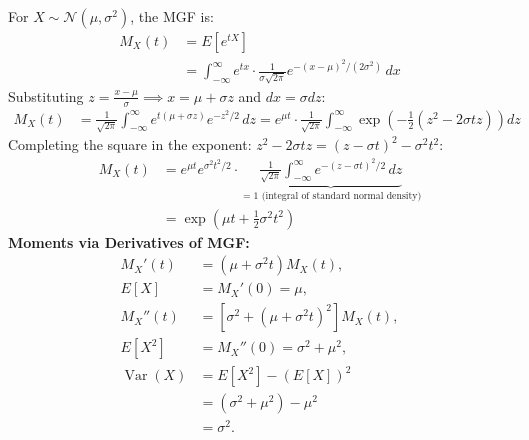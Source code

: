 \documentclass[12pt,a4paper]{article}
\begin{document}
\begin{tcolorbox}[examplebox, title={\textbf{Derivation: MGF and Moments of the Normal Distribution}}]
For $X \sim \mathcal{N}(\mu, \sigma^2)$, the MGF is:
\begin{equation}
  \begin{aligned}
    M_X(t) &= E[e^{tX}] \\[3pt]
    &= \int_{-\infty}^\infty e^{tx} \cdot \frac{1}{\sigma\sqrt{2\pi}} e^{-(x-\mu)^2/(2\sigma^2)} \, dx
  \end{aligned}
\end{equation}
Substituting $z = \frac{x-\mu}{\sigma} \implies x = \mu + \sigma z$ and $dx = \sigma dz$:
\begin{align}
  M_X(t) &= \frac{1}{\sqrt{2\pi}} \int_{-\infty}^\infty e^{t(\mu + \sigma z)} e^{-z^2/2} \, dz = e^{\mu t} \cdot \frac{1}{\sqrt{2\pi}} \int_{-\infty}^\infty \exp\left(-\frac{1}{2}(z^2 - 2\sigma t z)\right) dz
\end{align}
Completing the square in the exponent: $z^2 - 2\sigma t z = (z - \sigma t)^2 - \sigma^2 t^2$:
\begin{equation}
  \begin{aligned}
    M_X(t) &= e^{\mu t} e^{\sigma^2 t^2 / 2} \cdot \underbrace{\frac{1}{\sqrt{2\pi}} \int_{-\infty}^\infty e^{-(z - \sigma t)^2/2} \, dz}_{= 1 \text{ (integral of standard normal density)}} \\[3pt]
    &= \exp\left(\mu t + \frac{1}{2}\sigma^2 t^2\right)
  \end{aligned}
\end{equation}
\textbf{Moments via Derivatives of MGF:}
\begin{align}
  M_X'(t) &= (\mu + \sigma^2 t) M_X(t), \\
  E[X] &= M_X'(0) = \mu, \\[4pt]
  M_X''(t) &= \left[\sigma^2 + (\mu + \sigma^2 t)^2\right] M_X(t), \\
  E[X^2] &= M_X''(0) = \sigma^2 + \mu^2, \\[4pt]
  \operatorname{Var}(X) &= E[X^2] - (E[X])^2 \nonumber \\
                       &= (\sigma^2 + \mu^2) - \mu^2 \nonumber \\
                       &= \sigma^2.
\end{align}
\end{tcolorbox}
\end{document}
